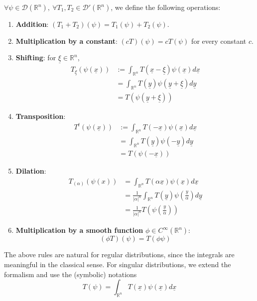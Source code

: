 \begin{definition}
	$\forall \psi \in \mathcal{D}(\mathbb{R}^n), \ \forall T_1, T_2 \in \mathcal{D}'(\mathbb{R}^n)$, we define the following operations:
	\begin{enumerate}
		\item \textbf{Addition}: $(T_1 + T_2) (\psi) = T_1(\psi) + T_2(\psi)$.
		\item \textbf{Multiplication  by a constant}: $(c T) (\psi) = c T(\psi)$ for every constant $c$.
		\item \textbf{Shifting}: for $\underline{\xi} \in \mathbb{R}^n$,
		\[
			\begin{aligned}
				T_{\underline{\xi}} (\psi(\underline{x}))
					& := \int_{\mathbb{R}^n} T(\underline{x} - \underline{\xi}) \psi(\underline{x}) d \underline{x} \\
					& = \int_{\mathbb{R}^n} T(\underline{y}) \psi(\underline{y} + \underline{\xi}) d \underline{y} \\
					& = T(\psi(\underline{y} + \underline{\xi}))
			\end{aligned}
		\]
		\item \textbf{Transposition}:
		\[
			\begin{aligned}
				T^t (\psi(\underline{x}))
					& := \int_{\mathbb{R}^n} T(-\underline{x}) \psi(\underline{x}) d \underline{x} \\
					& = \int_{\mathbb{R}^n} T(\underline{y}) \psi(-\underline{y}) d \underline{y} \\
					& = T(\psi(-\underline{x}))
			\end{aligned}
		\]
		\item \textbf{Dilation}:
		\[
			\begin{aligned}
				T_{(\alpha)} (\psi(x))
					& = \int_{\mathbb{R}^n} T(\alpha \underline{x}) \psi(\underline{x}) d \underline{x} \\
					& = \frac{1}{|\alpha|^n} \int_{\mathbb{R}^n} T(\underline{y}) \psi \left( \frac{\underline{y}}{\alpha} \right) d \underline{y} \\
					& = \frac{1}{|\alpha|^n} T \left( \psi \left( \frac{\underline{y}}{\alpha} \right) \right)
			\end{aligned}
		\]
		\item \textbf{Multiplication by a smooth function} $\phi \in C^{\infty} (\mathbb{R}^n)$:
		\[
			(\phi T) (\psi) = T(\phi \psi)
		\]
	\end{enumerate}
\end{definition}

\begin{remark}
	The above rules are natural for regular distributions, since the integrals are meaningful in the classical sense. For singular distributions, we extend the formalism and use the (symbolic) notations
	\[
		T(\psi) = \int_{\mathbb{R}^n} T(\underline{x}) \psi(\underline{x}) d \underline{x}
	\]
\end{remark}

